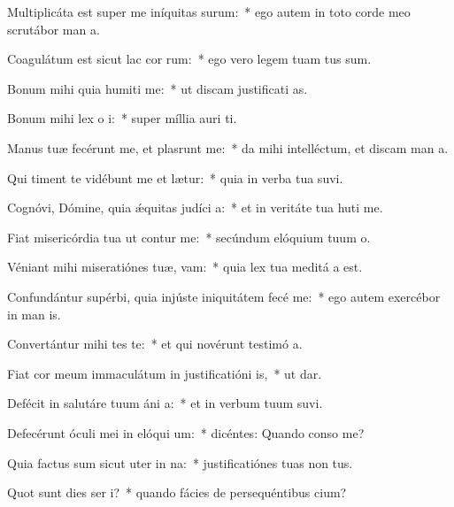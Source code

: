\item Multiplicáta est super me iníquitas surum:~* ego autem in toto corde meo scrutábor man a.
\item Coagulátum est sicut lac cor rum:~* ego vero legem tuam tus sum.
\item Bonum mihi quia humiti me:~* ut discam justificati as.
\item Bonum mihi lex o i:~* super míllia auri  ti.
\item Manus tuæ fecérunt me, et plasrunt me:~* da mihi intelléctum, et discam man a.
\item Qui timent te vidébunt me et lætur:~* quia in verba tua suvi.
\item Cognóvi, Dómine, quia ǽquitas judíci a:~* et in veritáte tua huti me.
\item Fiat misericórdia tua ut contur me:~* secúndum elóquium tuum  o.
\item Véniant mihi miseratiónes tuæ,  vam:~* quia lex tua meditá a est.
\item Confundántur supérbi, quia injúste iniquitátem fecé  me:~* ego autem exercébor in man is.
\item Convertántur mihi tes te:~* et qui novérunt testimó a.
\item Fiat cor meum immaculátum in justificatióni is,~* ut  dar.
\item Defécit in salutáre tuum áni a:~* et in verbum tuum suvi.
\item Defecérunt óculi mei in elóqui um:~* dicéntes: Quando conso me?
\item Quia factus sum sicut uter in na:~* justificatiónes tuas non  tus.
\item Quot sunt dies ser i?~* quando fácies de persequéntibus  cium?
